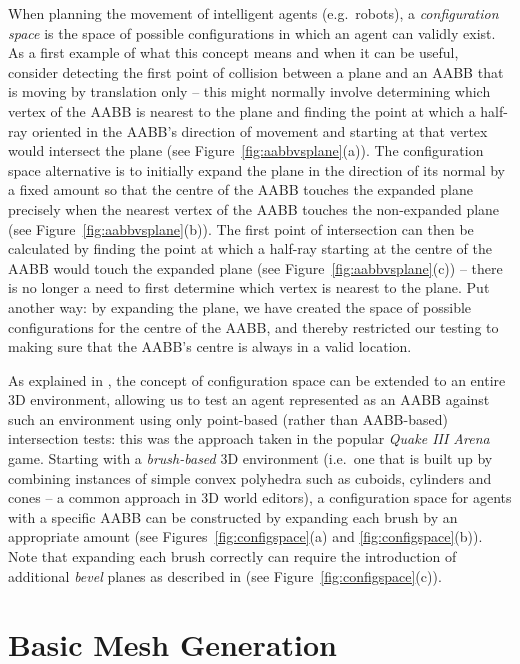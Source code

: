 \documentclass[10pt,twocolumn]{article}
\begin{document}
When planning the movement of intelligent agents (e.g.~robots), a \emph{configuration space} is the space of possible configurations in which an agent can validly exist. As a first example of what this concept means and when it can be useful, consider detecting the first point of collision between a plane and an AABB that is moving by translation only -- this might normally involve determining which vertex of the AABB is nearest to the plane and finding the point at which a half-ray oriented in the AABB's direction of movement and starting at that vertex would intersect the plane (see Figure~\ref{fig:aabbvsplane}(a)). The configuration space alternative is to initially expand the plane in the direction of its normal by a fixed amount so that the centre of the AABB touches the expanded plane precisely when the nearest vertex of the AABB touches the non-expanded plane (see Figure~\ref{fig:aabbvsplane}(b)). The first point of intersection can then be calculated by finding the point at which a half-ray starting at the centre of the AABB would touch the expanded plane (see Figure~\ref{fig:aabbvsplane}(c)) -- there is no longer a need to first determine which vertex is nearest to the plane. Put another way: by expanding the plane, we have created the space of possible configurations for the centre of the AABB, and thereby restricted our testing to making sure that the AABB's centre is always in a valid location.

As explained in \cite{vanwaveren01}, the concept of configuration space can be extended to an entire 3D environment, allowing us to test an agent represented as an AABB against such an environment using only point-based (rather than AABB-based) intersection tests: this was the approach taken in the popular \emph{Quake III Arena} game. Starting with a \emph{brush-based} 3D environment (i.e.~one that is built up by combining instances of simple convex polyhedra such as cuboids, cylinders and cones -- a common approach in 3D world editors), a configuration space for agents with a specific AABB can be constructed by expanding each brush by an appropriate amount (see Figures~\ref{fig:configspace}(a) and \ref{fig:configspace}(b)). Note that expanding each brush correctly can require the introduction of additional \emph{bevel} planes as described in \cite{vanwaveren01} (see Figure~\ref{fig:configspace}(c)).

\section{Basic Mesh Generation}
\label{sec:meshgen}
\end{document}
